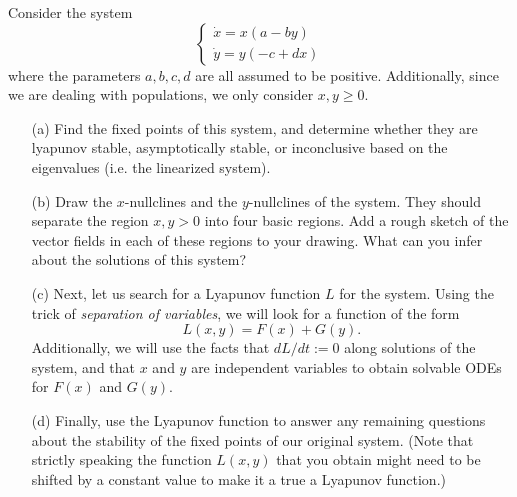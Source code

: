 \documentclass[12pt]{report}
\begin{document}
\newpage



\begin{problem}
    Consider the system
\begin{equation}
\left\{\begin{array}{l}
\dot{x}=x(a-by) \\
\dot{y}=y(-c+dx)
\end{array}\right.
\end{equation}
where the parameters $a,b,c,d$ are all assumed to be positive. Additionally, since we are dealing with populations, we only consider $x,y \geq 0$.\\

\begin{enumerate}
    
\item[(a)] Find the fixed points of this system, and determine whether they are lyapunov stable, asymptotically stable, or inconclusive based on the eigenvalues (i.e. the linearized system).

\item[(b)] Draw the $x$-nullclines and the $y$-nullclines of the system. They should separate the region $x,y>0$ into four basic regions. Add a rough sketch of the vector fields in each of these regions to your drawing. What can you infer about the solutions of this system? 

\item[(c)] Next, let us search for a Lyapunov function $L$ for the system. Using the trick of {\it separation of variables}, we will look for a function of the form
\begin{equation}
    L(x,y) = F(x) + G(y).
\end{equation}
Additionally, we will use the facts that $dL/dt := 0$ along solutions of the system, and that $x$ and $y$ are independent variables to obtain solvable ODEs for $F(x)$ and $G(y)$. \\

\item[(d)] Finally, use the Lyapunov function to answer any remaining questions about the stability of the fixed points of our original system. (Note that strictly speaking the function $L(x,y)$ that you obtain might need to be shifted by a constant value to make it a true a Lyapunov function.) 

\end{enumerate}

\end{problem}
\end{document}
